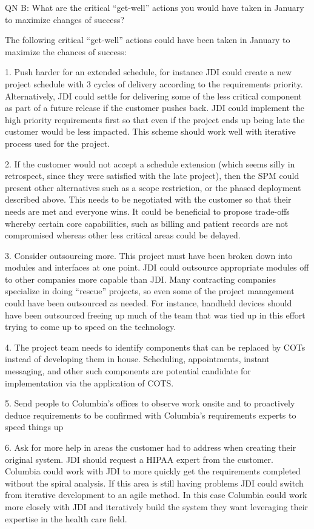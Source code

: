 \documentclass[12pt]{article}
\begin{document}
QN B: What are the critical “get-well” actions you would have taken in January to maximize changes
of success?

The following critical “get-well” actions could have been taken in January to maximize the chances
of success:

1.  Push harder for an extended schedule, for instance JDI could create a new project schedule with
3 cycles of delivery according to the requirements priority.  Alternatively, JDI could settle for
delivering some of the less critical component as part of a future release if the customer pushes
back.  JDI could implement the high priority requirements first so that even if the project ends up
being late the customer would be less impacted.  This scheme should work well with iterative process
used for the project.

2.  If the customer would not accept a schedule extension (which seems silly in retrospect, since
they were satisfied with the late project), then the SPM could present other alternatives such as a
scope restriction, or the phased deployment described above.  This needs to be negotiated with the
customer so that their needs are met and everyone wins.  It could be beneficial to propose
trade-offs whereby certain core capabilities, such as billing and patient records are not
compromised whereas other less critical areas could be delayed.

3.  Consider outsourcing more.  This project must have been broken down into modules and interfaces
at one point.  JDI could outsource appropriate modules off to other companies more capable than JDI.
Many contracting companies specialize in doing “rescue” projects, so even some of the project
management could have been outsourced as needed.  For instance, handheld devices should have been
outsourced freeing up much of the team that was tied up in this effort trying to come up to speed on
the technology.

4.  The project team needs to identify components that can be replaced by COTs instead of developing
them in house.  Scheduling, appointments, instant messaging, and other such components are potential
candidate for implementation via the application of COTS.

5.  Send people to Columbia’s offices to observe work onsite and to proactively deduce requirements
to be confirmed with Columbia’s requirements experts to speed things up

6.  Ask for more help in areas the customer had to address when creating their original system.  JDI
should request a HIPAA expert from the customer.  Columbia could work with JDI to more quickly get
the requirements completed without the spiral analysis.  If this area is still having problems JDI
could switch from iterative development to an agile method.  In this case Columbia could work more
closely with JDI and iteratively build the system they want leveraging their expertise in the health
care field.
\end{document}
